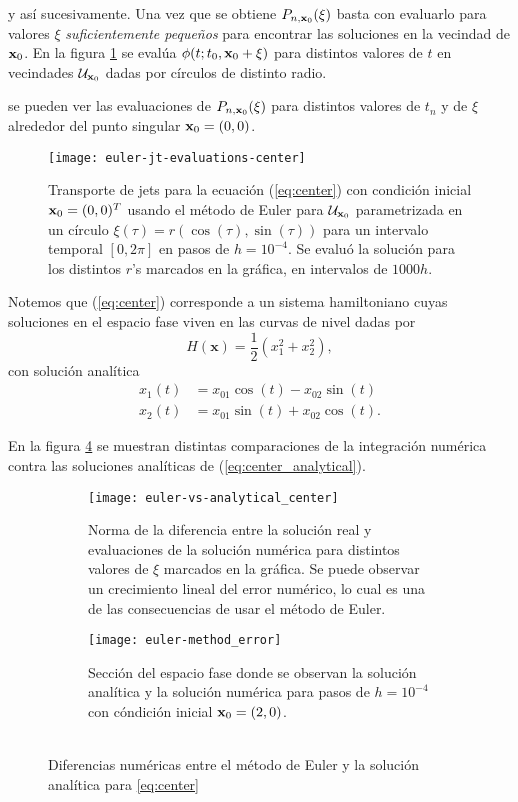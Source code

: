 y así sucesivamente. Una vez que se obtiene $P_{n,\mathbf{x}_0}(\xi)$ basta con evaluarlo para valores $\mathbb{\xi}$ \textit{suficientemente pequeños} para encontrar las soluciones en la vecindad de $\mathbf{x}_0$. En la figura \ref{fig:center-evals} se evalúa $\phi(t;t_0,\mathbf{x}_0 + \xi)$ para distintos valores de $t$ en vecindades $\mathcal{U}_{\mathbf{x}_0}$ dadas por círculos de distinto radio.

se pueden ver las evaluaciones de $P_{n,\mathbf{x}_0}(\xi)$ para distintos valores de $t_n$ y de $\xi$ alrededor del punto singular $\mathbf{x}_0 = (0,0)$.

\begin{figure}[h!]
 \centering
 \texttt{[image: euler-jt-evaluations-center]}
 \caption{Transporte de jets para la ecuación (\ref{eq:center}) con condición inicial $\mathbf{x}_0 = (0,0)^T$ usando el método de Euler para $\mathcal{U}_{\mathbf{x}_0}$ parametrizada en un círculo $\xi(\tau) = r\left( \cos(\tau),\sin(\tau) \right)$ para un intervalo temporal $[0,2\pi]$ en pasos de $h=10^{-4}$. Se evaluó la solución para los distintos $r$'s marcados en la gráfica, en intervalos de $1000h$.}
 \label{fig:center-evals}
\end{figure}

Notemos que (\ref{eq:center}) corresponde a un sistema hamiltoniano cuyas soluciones en el espacio fase viven en las curvas de nivel dadas por
\begin{equation*}
H(\mathbf{x}) = \frac{1}{2} \left( x_1^2 + x_2^2 \right),
\end{equation*} 
con solución analítica
\begin{align}
 x_1(t) &= x_{01}\cos{(t)} - x_{02}\sin{(t)} \nonumber \\
 x_2(t) &= x_{01}\sin{(t)} + x_{02}\cos{(t)}.
 \label{eq:center_analytical}
\end{align}

En la figura \ref{fig:center_anal_comparison} se muestran distintas comparaciones de la integración numérica contra las soluciones analíticas de (\ref{eq:center_analytical}).

\begin{figure}[h!]
\centering
\begin{subfigure}{0.49\textwidth}
	\centering
	\texttt{[image: euler-vs-analytical\_center]}
	\caption{Norma de la diferencia entre la solución real y evaluaciones de la solución numérica para distintos valores de $\xi$ marcados en la gráfica. Se puede observar un crecimiento lineal del error numérico, lo cual es una de las consecuencias de usar el método de Euler.}
	\label{fig:center-eu_vs_anal}
\end{subfigure}
%
\begin{subfigure}{0.49\textwidth}
	\centering
	\texttt{[image: euler-method\_error]}
	\caption{Sección del espacio fase donde se observan la solución analítica y la solución numérica para pasos de $h=10^{-4}$ con cóndición inicial $\mathbf{x}_0 = (2,0)$. \\ \\}
	\label{fig:center_not-closed}
\end{subfigure}
\caption{Diferencias numéricas entre el método de Euler y la solución analítica para \ref{eq:center}}
\label{fig:center_anal_comparison}
\end{figure}



